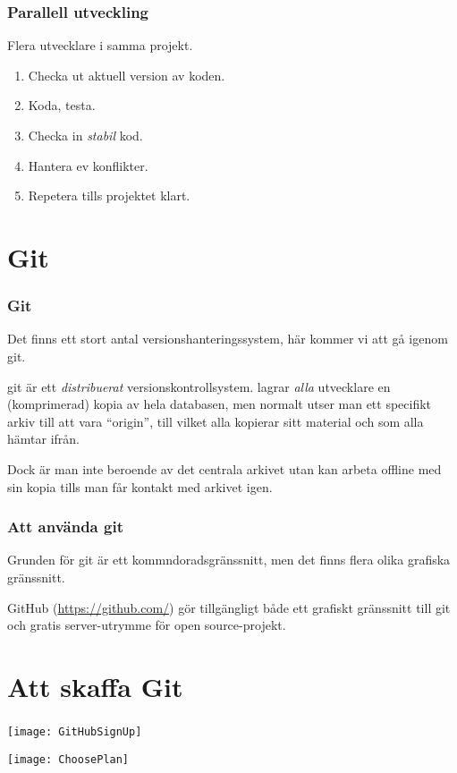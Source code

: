\documentclass[swedish]{beamer}
\begin{document}
\begin{frame}
\frametitle{Parallell utveckling}

Flera utvecklare i samma projekt.
\begin{enumerate}
\item Checka ut aktuell version av koden.
\item Koda, testa.
\item Checka in \emph{stabil} kod.
\item Hantera ev konflikter.
\item Repetera tills projektet klart.
\end{enumerate}
\end{frame}

\section{Git}
\begin{frame}
\frametitle{Git}
Det finns ett stort antal versionshanteringssystem, här kommer vi att gå igenom git.

  git är ett \emph{distribuerat} versionskontrollsystem.  \Mao lagrar \emph{alla} utvecklare en (komprimerad) kopia av hela databasen, men normalt utser man ett specifikt arkiv till att vara ``origin'', till vilket alla kopierar sitt material och som alla hämtar ifrån.

Dock är man inte beroende av det centrala arkivet utan kan arbeta offline med sin kopia tills man får kontakt med arkivet igen.

\end{frame}

\begin{frame}
  \frametitle{Att använda git}
Grunden för git är ett kommndoradsgränssnitt, men det finns flera olika grafiska gränssnitt.

GitHub (\url{https://github.com/}) gör tillgängligt både ett grafiskt gränssnitt till git och gratis server-utrymme för open source-projekt.

\end{frame}

\section{Att skaffa Git}
\begin{frame}
\frametitle{}
\texttt{[image: GitHubSignUp]}
\end{frame}

\begin{frame}[fragile]
\texttt{[image: ChoosePlan]}
\end{frame}
\end{document}
